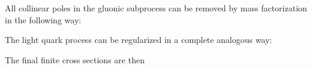 All collinear poles in the gluonic subprocess can be removed by mass factorization in the following way:

The light quark process can be regularized in a complete analogous way:

The final finite cross sections are then

